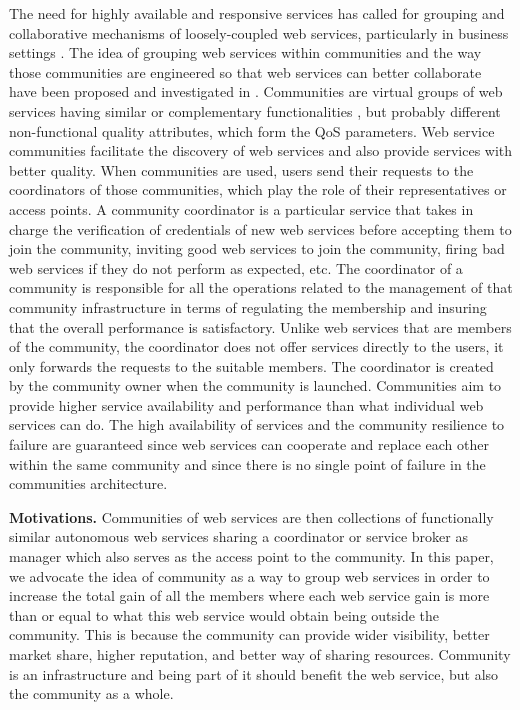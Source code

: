\documentclass[10pt,journal,cspaper,compsoc]{IEEEtran}
\begin{document}
The need for highly available and responsive services has called
for grouping and collaborative mechanisms of loosely-coupled web
services, particularly in business settings
\cite{YuB13,Younas2012,LiuBWZ13}. The idea of grouping web
services within communities and the way those communities are
engineered so that web services can better collaborate have been
proposed and investigated in
\cite{DBLP:journals/ijebr/MaamarSTBB09,DBLP:journals/internet/BenatallahSD03,Rosario:2008:PQS:1512146.1512290}.
Communities are virtual groups of web services having similar or
complementary functionalities \cite{Zeng:2003:QDW:775152.775211,
Paik:2005:TSS:2229263.2230038,Medjahed05adynamic,10.1109/ARES.2008.7},
but probably different non-functional quality attributes, which
form the QoS parameters. Web service communities facilitate the
discovery of web services and also provide services with better
quality. When communities are used, users send their requests to
the coordinators of those communities, which play the role of
their representatives or access points. A community coordinator is
a particular service that takes in charge the verification of
credentials of new web services before accepting them to join the
community, inviting good web services to join the community,
firing bad web services if they do not perform as expected, etc.
The coordinator of a community is responsible for all the
operations related to the management of that community
infrastructure in terms of regulating the membership and insuring
that the overall performance is satisfactory. Unlike web services
that are members of the community, the coordinator does not offer
services directly to the users, it only forwards the requests to
the suitable members. The coordinator is created by the community
owner when the community is launched. Communities aim to provide
higher service availability and performance than what individual
web services can do. The high availability of services and the
community resilience to failure are guaranteed since web services
can cooperate and replace each other within the same community and
since there is no single point of failure in the communities
architecture.

\textbf{Motivations.} Communities of web services are then
collections of functionally similar autonomous web services
sharing a coordinator or service broker as manager which also
serves as the access point to the community. In this paper, we
advocate the idea of community as a way to group web services in
order to increase the total gain of all the members where each web
service gain is more than or equal to what this web service would
obtain being outside the community. This is because the community
can provide wider visibility, better market share, higher
reputation, and better way of sharing resources. Community is an
infrastructure and being part of it should benefit the web
service, but also the community as a whole.
\end{document}
